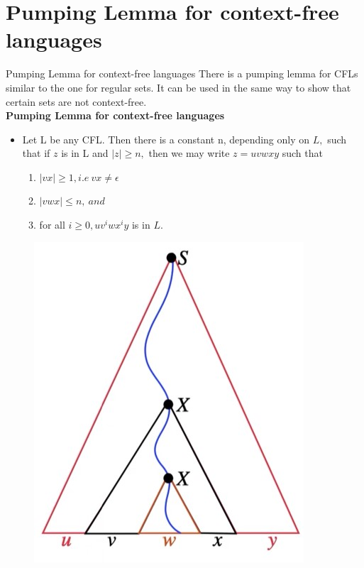 \documentclass{beamer}
\begin{document}
\section{Pumping Lemma for context-free languages}
\begin{frame}{Pumping Lemma for context-free languages}
	There is a pumping lemma for CFLs similar to the one for regular sets. It 
	can be used in the same way to show that certain sets are not context-free. \\
	\textbf{Pumping Lemma for context-free languages}
	\begin{itemize}
		\item Let L be any CFL. Then there is a constant n, depending only on $L,$ such 
		that if $z$ is in L and $| z | \geq n,$ then we may write $z = uvwxy$ such that
		\begin{enumerate}
			\item $|vx| \geq 1,i.e\ vx \neq \epsilon$
			\item $|vwx|\leq n, \ and$
			\item for all $i\geq 0, uv^iwx^iy$ is in $L$.
		\end{enumerate}
	\end{itemize}
\begin{figure}
	\includegraphics[scale=.4]{img4/m8}
\end{figure}
\end{frame}
\end{document}
